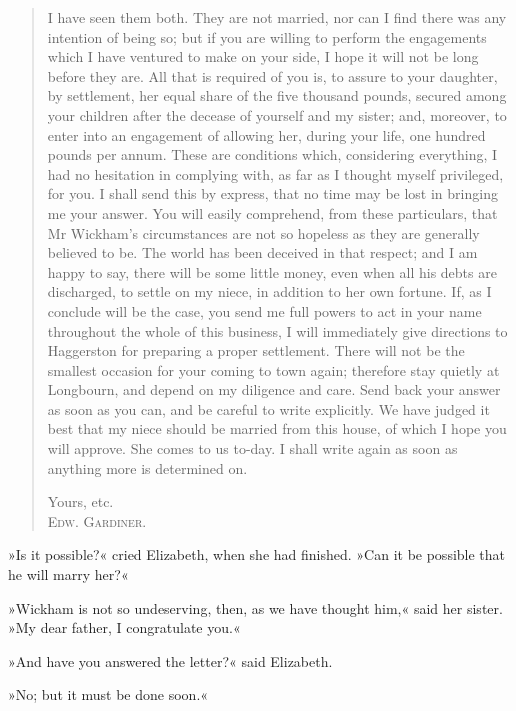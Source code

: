 \begin{quotation}

I have seen them both. They are not married, nor can I find there was any intention of being so; but if you are willing to perform the engagements which I have ventured to make on your side, I hope it will not be long before they are. All that is required of you is, to assure to your daughter, by settlement, her equal share of the five thousand pounds, secured among your children after the decease of yourself and my sister; and, moreover, to enter into an engagement of allowing her, during your life, one hundred pounds per annum. These are conditions which, considering everything, I had no hesitation in complying with, as far as I thought myself privileged, for you. I shall send this by express, that no time may be lost in bringing me your answer. You will easily comprehend, from these particulars, that Mr Wickham's circumstances are not so hopeless as they are generally believed to be. The world has been deceived in that respect; and I am happy to say, there will be some little money, even when all his debts are discharged, to settle on my niece, in addition to her own fortune. If, as I conclude will be the case, you send me full powers to act in your name throughout the whole of this business, I will immediately give directions to Haggerston for preparing a proper settlement. There will not be the smallest occasion for your coming to town again; therefore stay quietly at Longbourn, and depend on my diligence and care. Send back your answer as soon as you can, and be careful to write explicitly. We have judged it best that my niece should be married from this house, of which I hope you will approve. She comes to us to-day. I shall write again as soon as anything more is determined on. 

\begin{flushright}
Yours, etc.\\
\textsc{Edw. Gardiner.}
\end{flushright}

\end{quotation}

»Is it possible?« cried Elizabeth, when she had finished. »Can it be possible that he will marry her?«

»Wickham is not so undeserving, then, as we have thought him,« said her sister. »My dear father, I congratulate you.«

»And have you answered the letter?« said Elizabeth.

»No; but it must be done soon.«

